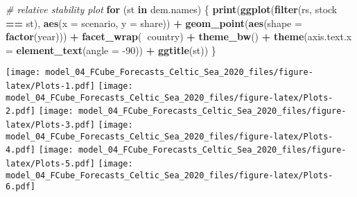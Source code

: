 \documentclass[
]{article}
\newenvironment{Shaded}{\begin{snugshade}}{\end{snugshade}}
\newcommand{\CommentTok}[1]{\textcolor[rgb]{0.56,0.35,0.01}{\textit{#1}}}
\newcommand{\ControlFlowTok}[1]{\textcolor[rgb]{0.13,0.29,0.53}{\textbf{#1}}}
\newcommand{\DataTypeTok}[1]{\textcolor[rgb]{0.13,0.29,0.53}{#1}}
\newcommand{\DecValTok}[1]{\textcolor[rgb]{0.00,0.00,0.81}{#1}}
\newcommand{\KeywordTok}[1]{\textcolor[rgb]{0.13,0.29,0.53}{\textbf{#1}}}
\newcommand{\NormalTok}[1]{#1}
\newcommand{\OperatorTok}[1]{\textcolor[rgb]{0.81,0.36,0.00}{\textbf{#1}}}
\newcommand{\StringTok}[1]{\textcolor[rgb]{0.31,0.60,0.02}{#1}}
\begin{document}
\begin{Shaded}
\begin{Highlighting}[]
\CommentTok{# relative stability plot}
\ControlFlowTok{for}\NormalTok{ (st }\ControlFlowTok{in}\NormalTok{ dem.names) \{}
    \KeywordTok{print}\NormalTok{(}\KeywordTok{ggplot}\NormalTok{(}\KeywordTok{filter}\NormalTok{(rs, stock }\OperatorTok{==}\StringTok{ }\NormalTok{st), }\KeywordTok{aes}\NormalTok{(}\DataTypeTok{x =}\NormalTok{ scenario, }\DataTypeTok{y =}\NormalTok{ share)) }\OperatorTok{+}\StringTok{ }\KeywordTok{geom_point}\NormalTok{(}\KeywordTok{aes}\NormalTok{(}\DataTypeTok{shape =} \KeywordTok{factor}\NormalTok{(year))) }\OperatorTok{+}\StringTok{ }
\StringTok{        }\KeywordTok{facet_wrap}\NormalTok{(}\OperatorTok{~}\NormalTok{country) }\OperatorTok{+}\StringTok{ }\KeywordTok{theme_bw}\NormalTok{() }\OperatorTok{+}\StringTok{ }\KeywordTok{theme}\NormalTok{(}\DataTypeTok{axis.text.x =} \KeywordTok{element_text}\NormalTok{(}\DataTypeTok{angle =} \DecValTok{-90}\NormalTok{)) }\OperatorTok{+}\StringTok{ }
\StringTok{        }\KeywordTok{ggtitle}\NormalTok{(st))}
\NormalTok{\}}
\end{Highlighting}
\end{Shaded}

\texttt{[image: model\_04\_FCube\_Forecasts\_Celtic\_Sea\_2020\_files/figure-latex/Plots-1.pdf]}
\texttt{[image: model\_04\_FCube\_Forecasts\_Celtic\_Sea\_2020\_files/figure-latex/Plots-2.pdf]}
\texttt{[image: model\_04\_FCube\_Forecasts\_Celtic\_Sea\_2020\_files/figure-latex/Plots-3.pdf]}
\texttt{[image: model\_04\_FCube\_Forecasts\_Celtic\_Sea\_2020\_files/figure-latex/Plots-4.pdf]}
\texttt{[image: model\_04\_FCube\_Forecasts\_Celtic\_Sea\_2020\_files/figure-latex/Plots-5.pdf]}
\texttt{[image: model\_04\_FCube\_Forecasts\_Celtic\_Sea\_2020\_files/figure-latex/Plots-6.pdf]}
\end{document}
